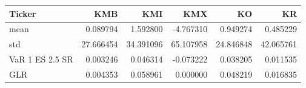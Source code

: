 \begin{tabular}{lrrrrr}
\toprule
Ticker & KMB & KMI & KMX & KO & KR \\
\midrule
mean & 0.089794 & 1.592800 & -4.767310 & 0.949274 & 0.485229 \\
std & 27.666454 & 34.391096 & 65.107958 & 24.846848 & 42.065761 \\
VaR 1%
ES 2.5%
SR & 0.003246 & 0.046314 & -0.073222 & 0.038205 & 0.011535 \\
GLR & 0.004353 & 0.058961 & 0.000000 & 0.048219 & 0.016835 \\
\bottomrule
\end{tabular}
